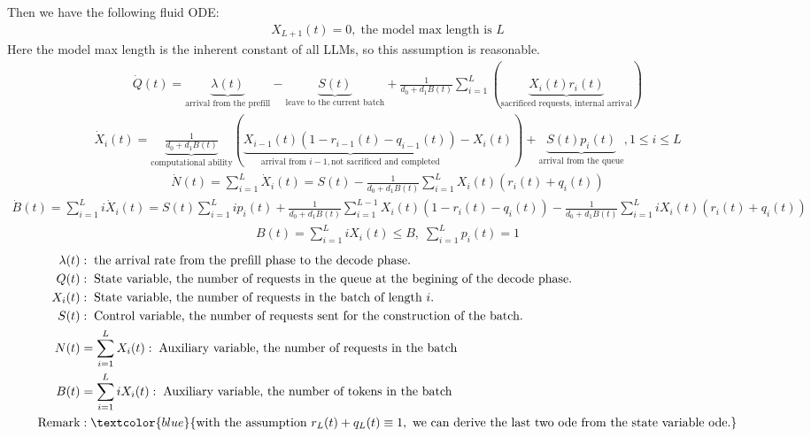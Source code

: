 Then we have the following fluid ODE:
\begin{align*}
X_{L+1}(t) =0, \;\text{the model max length is $L$}    
\end{align*}
Here the model max length is the inherent constant of all LLMs, so this assumption is reasonable.
\begin{align*}
    \dot{Q}(t) = \underbrace{\lambda(t)}_{\text{arrival from the prefill}} - \underbrace{S(t)}_{\text{leave to the current batch}} + \frac{1}{d_0+d_1 B(t)} \sum_{i=1}^L \left( \underbrace{X_i(t)r_i(t)}_{\text{sacrificed requests, internal arrival}}  \right)
\end{align*}
\begin{align*}
\dot{X}_{i}(t)=\underbrace{\frac{1}{d_{0}+d_{1}B(t)}}_{\text{computational ability}}\left(  \underbrace{X_{i-1}(t)(1-r_{i-1}(t) -q_{i-1}(t))}_{\text{arrival from } i-1, \text{not sacrificed and completed}}-X_{i}(t)\right)+\underbrace{S(t)p_{i}(t)}_{\text{arrival from the queue}} , 1\leq i\leq L
\end{align*}
\begin{align*}
    \dot{N}(t) =\sum_{i=1}^L \dot{X}_i(t)= S(t)  - \frac{1}{d_0+d_1 B(t)} \sum_{i=1}^L X_i(t)(r_i(t)+q_i(t))
\end{align*}
\begin{align*}
    \dot{B}(t) =\sum_{i=1}^L i\dot{X}_i(t)= S(t)\sum_{i=1}^{L} i p_i(t)  + \frac{1}{d_0+d_1 B(t)} \sum_{i=1}^{L-1} X_i(t)(1-r_i(t)-q_i(t))  - \frac{1}{d_0+d_1 B(t)} \sum_{i=1}^{L} i  X_i(t)(r_i(t)+q_i(t) )
\end{align*}
\begin{align*}
    B(t) = \sum_{i=1}^L i X_i(t) \leq B, \; \sum_{i=1}^{L}p_i(t) = 1
\end{align*}
\begin{align*}
    \lambda(t)&:\; \text{the arrival rate from the prefill phase to the decode phase.}\\
    Q(t)& : \; \text{State variable, the number of requests in the queue at the begining of the decode phase.}\\
    X_i(t)& : \; \text{State variable, the number of requests in the batch of length $i$.}\\
    S(t)& : \; \text{Control variable, the number of requests sent for the construction of the batch.}\\
    N(t)&=\sum_{i=1}^{L}X_i(t) : \; \text{Auxiliary variable, the number of requests in the batch}\\
    B(t)&=\sum_{i=1}^{L}iX_i(t) : \; \text{Auxiliary variable, the number of tokens in the batch}\\
    \text{Remark}&: \textcolor{blue}{\text{with the assumption }r_{L}(t)+q_L(t)\equiv 1, \text{ we can derive the last two ode from the state variable ode.} }
\end{align*}

